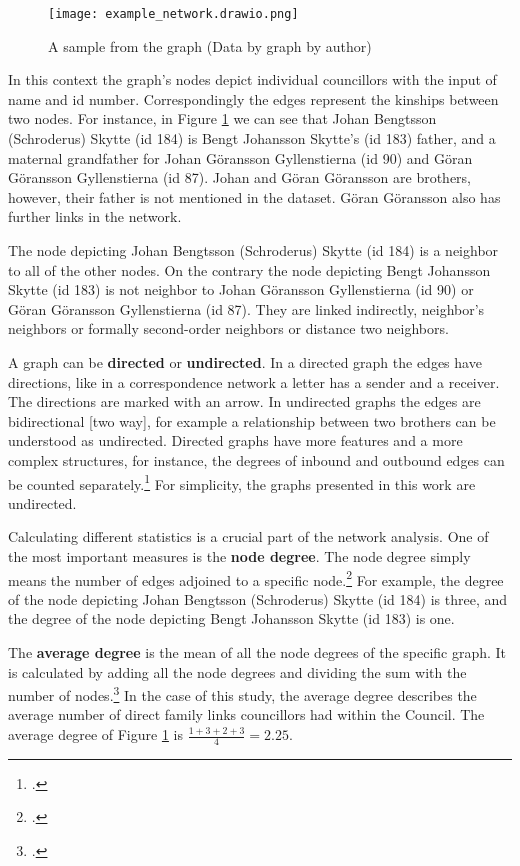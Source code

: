 \begin{figure}
	\texttt{[image: example\_network.drawio.png]}
	\centering
	\caption[A sample from the graph]{A sample from the graph (Data by \cite{councillorsDS} graph by author)} 
	\centering
	\label{samplegraph}
\end{figure}
In this context the graph's nodes depict individual councillors with the input of name and id number. Correspondingly the edges represent the kinships between two nodes. For instance, in Figure \ref{samplegraph} we can see that Johan Bengtsson (Schroderus) Skytte (id 184) is Bengt Johansson Skytte's (id 183) father, and a maternal grandfather for Johan Göransson Gyllenstierna (id 90) and Göran Göransson Gyllenstierna (id 87). Johan and Göran Göransson are brothers, however, their father is not mentioned in the dataset. Göran Göransson also has further links in the network.

The node depicting Johan Bengtsson (Schroderus) Skytte (id 184) is a neighbor to all of the other nodes. On the contrary the node depicting Bengt Johansson Skytte (id 183) is not neighbor to Johan Göransson Gyllenstierna (id 90) or Göran Göransson Gyllenstierna (id 87). They are linked indirectly, neighbor's neighbors or formally second-order neighbors or distance two neighbors. 

A graph can be \textbf{directed} or \textbf{undirected}. In a directed graph the edges have directions, like in a correspondence network a letter has a sender and a receiver. The directions are marked with an arrow. In undirected graphs the edges are bidirectional [two way], for example a relationship between two brothers can be understood as undirected. Directed graphs have more features and a more complex structures, for instance, the degrees of inbound and outbound edges can be counted separately.\footcite[pp. 1-2.]{RajPM2018} For simplicity, the graphs presented in this work are undirected.

Calculating different statistics is a crucial part of the network analysis. One of the most important measures is the \textbf{node degree}. The node degree simply means the number of edges adjoined to a specific node.\footcite[pp. 2-3.]{RajPM2018} For example, the degree of the node depicting Johan Bengtsson (Schroderus) Skytte (id 184) is three, and the degree of the node depicting Bengt Johansson Skytte (id 183) is one. 

The \textbf{average degree} is the mean of all the node degrees of the specific graph. It is calculated by adding all the node degrees and dividing the sum with the number of nodes.\footcite[pp. 3-4.]{RajPM2018} In the case of this study, the average degree describes the average number of direct family links councillors had within the Council. The average degree of Figure \ref{samplegraph} is $\frac{1 + 3 + 2 + 3}{4} = 2.25$.

